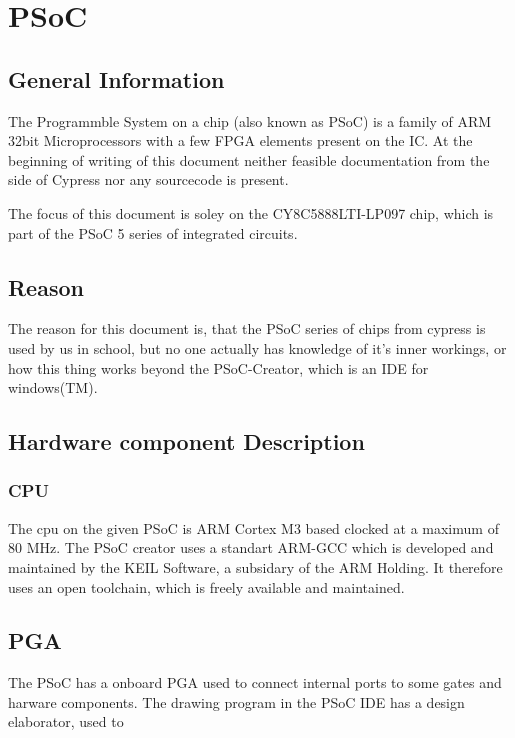 \documentclass[12pt,a4paper]{article}
\def\psocdisasm{0}
\begin{document}
\if\psocdisasm

\section{PSoC}

\subsection{General Information}

The Programmble System on a chip (also known as PSoC) is a family of ARM 32bit
Microprocessors with a few FPGA elements present on the IC. At the beginning of
writing of this document neither feasible documentation from the side of Cypress
nor any sourcecode is present.

The focus of this document is soley on the CY8C5888LTI-LP097 chip, which is part
of the PSoC 5 series of integrated circuits.

\subsection{Reason}

The reason for this document is, that the PSoC series of chips from cypress is
used by us in school, but no one actually has knowledge of it's inner workings,
or how this thing works beyond the PSoC-Creator, which is an IDE for 
windows(TM).

\subsection{Hardware component Description}

\subsubsection{CPU}

The cpu on the given PSoC is ARM Cortex M3 based clocked at a maximum of 80 MHz.
The PSoC creator uses a standart ARM-GCC which is developed and maintained by
the KEIL Software, a subsidary of the ARM Holding. It therefore uses an open
toolchain, which is freely available and maintained.

\subsection{PGA}

The PSoC has a onboard PGA used to connect internal ports to some gates and
harware components. The drawing program in the PSoC IDE has a design elaborator,
used to 
\end{document}
